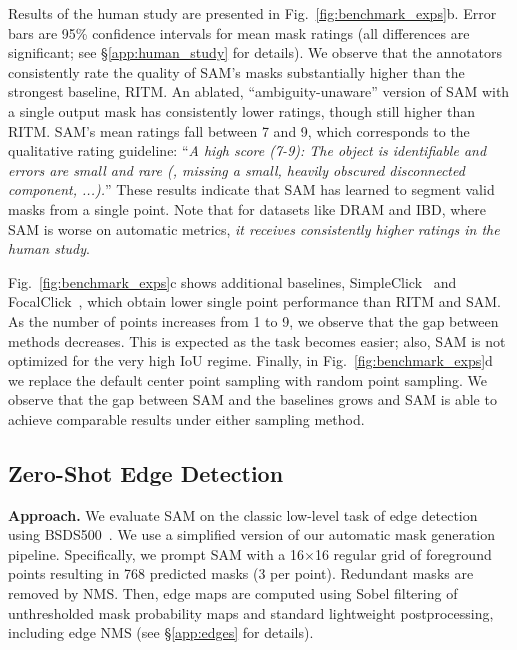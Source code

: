 \documentclass[10pt,twocolumn,letterpaper]{article}
\renewcommand{\paragraph}[1]{\vspace{1.25mm}\noindent\textbf{#1}}
\newcommand{\x}{{\times}}
\newcommand{\sam}{SAM\xspace}
\newcommand{\fig}[1]{Fig.~\ref{#1}}
\begin{document}
Results of the human study are presented in \fig{fig:benchmark_exps}{\color{linkcolor}b}. Error bars are 95\% confidence intervals for mean mask ratings (all differences are significant; see \S\ref{app:human_study} for details). We observe that the annotators consistently rate the quality of \sam's masks substantially higher than the strongest baseline, RITM. An ablated, ``ambiguity-unaware'' version of \sam with a single output mask has consistently lower ratings, though still higher than RITM. \sam's mean ratings fall between 7 and 9, which corresponds to the qualitative rating guideline: ``\emph{A high score (7-9): The object is identifiable and errors are small and rare (\eg, missing a small, heavily obscured disconnected component, ...).}'' These results indicate that \sam has learned to segment valid masks from a single point. Note that for datasets like DRAM and IBD, where \sam is worse on automatic metrics, \emph{it receives consistently higher ratings in the human study}.

\fig{fig:benchmark_exps}{\color{linkcolor}c} shows additional baselines, SimpleClick~\cite{liu2022simpleclick} and FocalClick~\cite{chen2022focalclick}, which obtain lower single point performance than RITM and \sam. As the number of points increases from 1 to 9, we observe that the gap between methods decreases. This is expected as the task becomes easier; also, \sam is not optimized for the very high IoU regime. Finally, in \fig{fig:benchmark_exps}{\color{linkcolor}d} we replace the default center point sampling with random point sampling. We observe that the gap between \sam and the baselines grows and \sam is able to achieve comparable results under either sampling method.

\subsection{Zero-Shot Edge Detection}\label{sec:eval:edge}

\paragraph{Approach.} We evaluate \sam on the classic low-level task of edge detection using BSDS500~\cite{martin2001database,arbelaez2010contour}. We use a simplified version of our automatic mask generation pipeline. Specifically, we prompt \sam with a 16$\x$16 regular grid of foreground points resulting in 768 predicted masks (3 per point). Redundant masks are removed by NMS. Then, edge maps are computed using Sobel filtering of unthresholded mask probability maps and standard lightweight postprocessing, including edge NMS (see \S\ref{app:edges} for details).
\end{document}
